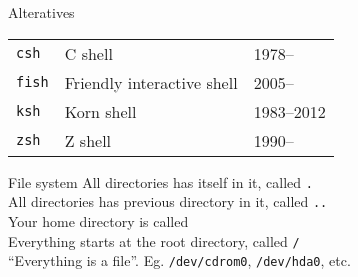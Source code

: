 \documentclass{beamer}
\let\tt\texttt
\let\tilde\texttildelow
\begin{document}
\begin{frame}{Alteratives}
        \begin{tabular}{p{} p{} p{}}
                \tt{csh}        & C shell   & 1978--  \\
                \tt{fish}       & Friendly interactive shell &  2005-- \\
                \tt{ksh}        & Korn shell & 1983--2012 \\
                \tt{zsh}        & Z shell & 1990--  \\
        \end{tabular}
\end{frame}

\begin{frame}{File system}
        All directories has itself in it, called \tt{.}                \\
        All directories has previous directory in it, called \tt{..}   \\
        Your home directory is called \tilde                           \\
        Everything starts at the root directory, called \tt{/}         \\
        ``Everything is a file''. Eg. \tt{/dev/cdrom0}, \tt{/dev/hda0}, etc.
\end{frame}
\end{document}
